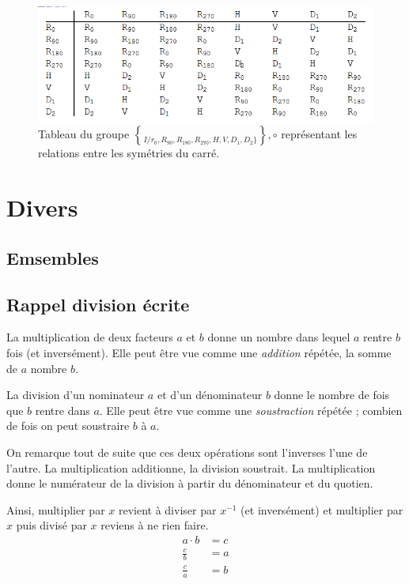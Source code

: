 \documentclass[a4paper]{article}
\begin{document}
    \begin{figure}[H]
        \includegraphics[width=\textwidth]{tableau_triangle.png}
        \caption{Tableau du groupe $\brace I/r_0, R_90, R_180, R_270, H, V, D_1,
        D_2 \rbrace$$, \circ$ représentant les relations entre les symétries du
        carré.}
        \label{fig:grptabl}
    \end{figure}


    \section{Divers}
    \subsection{Emsembles} \label{ss:jargondom}
    \subsection{Rappel division écrite}
    La multiplication de deux facteurs $a$ et $b$ donne un nombre dans lequel
    $a$ rentre $b$ fois (et inversément). Elle peut être vue comme une
    \emph{addition} répétée, la somme de $a$ nombre $b$.

    La division d'un nominateur $a$ et d'un dénominateur $b$ donne le nombre de
    fois que $b$ rentre dans $a$. Elle peut être vue comme une
    \emph{soustraction} répétée ; combien de fois on peut soustraire $b$ à $a$.

    On remarque tout de suite que ces deux opérations sont l'inverses l'une de
    l'autre. La multiplication additionne, la division soustrait. La
    multiplication donne le numérateur de la division à partir du dénominateur
    et du quotien.

    Ainsi, multiplier par $x$ revient à diviser par $x^{-1}$ (et inversément) et
    multiplier par $x$ puis divisé par $x$ reviens à ne rien faire.
    \begin{align*}
        a \cdot b &= c \\
        \frac{c}{b} &= a \\
        \frac{c}{a} &= b
    \end{align*}
\end{document}
